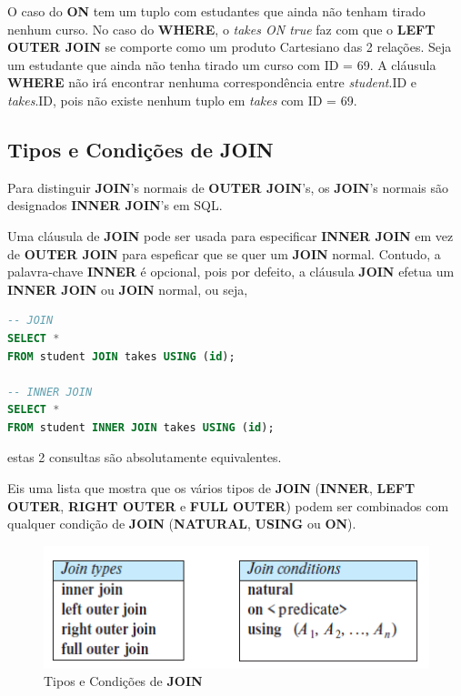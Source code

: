 \documentclass[oneside]{book}
\theoremstyle{definition}
\begin{document}
O caso do \textbf{ON} tem um tuplo com estudantes que ainda não tenham tirado nenhum curso. No caso do \textbf{WHERE}, o \textit{takes ON true} faz com que o \textbf{LEFT OUTER JOIN} se comporte como um produto Cartesiano das 2 relações. Seja um estudante que ainda não tenha tirado um curso com ID = 69. A cláusula \textbf{WHERE} não irá encontrar nenhuma correspondência entre \textit{student}.ID e \textit{takes}.ID, pois não existe nenhum tuplo em \textit{takes} com ID = 69.

\subsection{Tipos e Condições de JOIN}
Para distinguir \textbf{JOIN}'s normais de \textbf{OUTER JOIN}'s, os \textbf{JOIN}'s normais são designados \textbf{INNER JOIN}'s em SQL.

Uma cláusula de \textbf{JOIN} pode ser usada para especificar \textbf{INNER JOIN} em vez de \textbf{OUTER JOIN} para espeficar que se quer um \textbf{JOIN} normal. Contudo, a palavra-chave \textbf{INNER} é opcional, pois por defeito, a cláusula \textbf{JOIN} efetua um \textbf{INNER JOIN} ou \textbf{JOIN} normal, ou seja,

\begin{lstlisting}[language=SQL, morekeywords={REFERENCES, REFRESH, MATERIALIZED, CONCURRENTLY}, framesep=8pt, xleftmargin=40pt, framexleftmargin=40pt, frame=tb, framerule=0pt]
-- JOIN
SELECT *
FROM student JOIN takes USING (id);

-- INNER JOIN
SELECT *
FROM student INNER JOIN takes USING (id);
\end{lstlisting}
estas 2 consultas são absolutamente equivalentes.

Eis uma lista que mostra que os vários tipos de \textbf{JOIN} (\textbf{INNER}, \textbf{LEFT OUTER}, \textbf{RIGHT OUTER} e \textbf{FULL OUTER}) podem ser combinados com qualquer condição de \textbf{JOIN} (\textbf{NATURAL}, \textbf{USING} ou \textbf{ON}).

\begin{figure}[H]
    \centering
    \includegraphics[scale = 0.5]{cap_sql/join_tipos_conds.png}
    \caption{Tipos e Condições de \textbf{JOIN}}
\end{figure}
\end{document}
